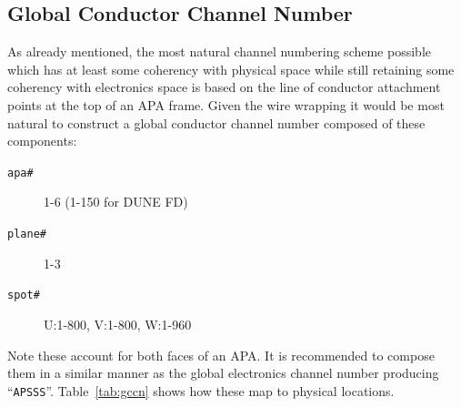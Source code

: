 \documentclass[pdftex,12pt,letter]{article}
\begin{document}
\subsection{Global Conductor Channel Number}

As already mentioned, the most natural channel numbering scheme
possible which has at least some coherency with physical space while
still retaining some coherency with electronics space is based on the
line of conductor attachment points at the top of an APA frame.  Given
the wire wrapping it would be most natural to construct a global conductor
channel number composed of these components:

\begin{description}
\item[\texttt{apa\#}] 1-6 (1-150 for DUNE FD)
\item[\texttt{plane\#}] 1-3
\item[\texttt{spot\#}] U:1-800, V:1-800, W:1-960
\end{description}

\noindent Note these account for both faces of an APA.
It is recommended to compose them in a similar manner as the global
electronics channel number producing ``\texttt{APSSS}''.
Table~\ref{tab:gccn} shows how these map to physical locations.
\end{document}
